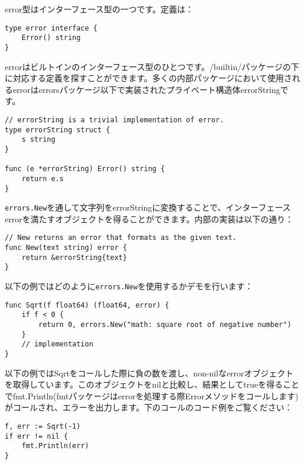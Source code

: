 error型はインターフェース型の一つです。定義は：

\begin{lstlisting}[numbers=none]
type error interface {
    Error() string
}
\end{lstlisting}

errorはビルトインのインターフェース型のひとつです。/builtin/パッケージの下に対応する定義を探すことができます。多くの内部パッケージにおいて使用されるerrorはerrorsパッケージ以下で実装されたプライベート構造体errorStringです。

\begin{lstlisting}[numbers=none]
// errorString is a trivial implementation of error.
type errorString struct {
    s string
}

func (e *errorString) Error() string {
    return e.s
}
\end{lstlisting}

\texttt{errors.New}を通して文字列をerrorStringに変換することで、インターフェースerrorを満たすオブジェクトを得ることができます。内部の実装は以下の通り：

\begin{lstlisting}[numbers=none]
// New returns an error that formats as the given text.
func New(text string) error {
    return &errorString{text}
}
\end{lstlisting}

以下の例ではどのように\texttt{errors.New}を使用するかデモを行います：



\begin{lstlisting}[numbers=none]
func Sqrt(f float64) (float64, error) {
    if f < 0 {
        return 0, errors.New("math: square root of negative number")
    }
    // implementation
}
\end{lstlisting}

以下の例ではSqrtをコールした際に負の数を渡し、non-nilなerrorオブジェクトを取得しています。このオブジェクトをnilと比較し、結果としてtrueを得ることでfmt.Println(fmtパッケージはerrorを処理する際Errorメソッドをコールします)がコールされ、エラーを出力します。下のコールのコード例をご覧ください：



\begin{lstlisting}[numbers=none]
f, err := Sqrt(-1)
if err != nil {
    fmt.Println(err)
}    
\end{lstlisting}
